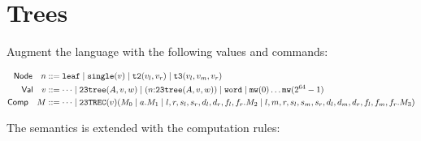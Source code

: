 \newcommand{\leaf}{\ensuremath{\mathtt{leaf}}}
\newcommand{\single}[1]{\ensuremath{\mathtt{single}(#1)}}
\newcommand{\ttwo}[2]{\ensuremath{\mathtt{t2}(#1,#2)}}
\newcommand{\tthree}[3]{\ensuremath{\mathtt{t3}(#1,#2,#3)}}
\newcommand{\ttrec}[8]{\mathtt{23TREC}(#1)(#2 \mid #3.#4 \mid #5.#6 \mid #7.#8)}
\newcommand{\tttree}[3]{\ensuremath{\mathtt{23tree}(#1,#2,#3)}}
\newcommand{\word}{\mathtt{word}}
\newcommand{\mw}[1]{\mathtt{mw}(#1)}
\newcommand{\join}{\mathsf{join}}
\newcommand{\cmp}{\mathsf{cmp}}
\newcommand{\ifnat}[3]{\mathsf{if}(#1;#2;#3)}
\newcommand{\const}[1]{\lam{\_}{\_}{#1}}
\newcommand{\eq}{\mathsf{eq}}
\newcommand{\macro}{@\!\!=}
\section{Trees}

Augment the language with the following values and commands:

\begin{align*}
    \mathsf{Node} \quad n &::= 
         \leaf
    \mid \single{v}
    \mid \ttwo{v_l}{v_r}
    \mid \tthree{v_l}{v_m}{v_r}\\
    \mathsf{Val} \quad v &::= \dots
    \mid \tttree{A}{v}{w}
    \mid (\isOf{n}{\tttree{A}{v}{w}})
    \mid \word
    \mid \mw{0} \dots \mw{2^{64}-1}\\
    \mathsf{Comp} \quad M &::= 
    \dots
    \mid \ttrec{v}{M_0}{a}{M_1}{l,r,s_l,s_r,d_l,d_r,f_l,f_r}{M_2}{l,m,r,s_l,s_m,s_r,d_l,d_m,d_r,f_l,f_m,f_r}{M_3}\\
\end{align*}

The semantics is extended with the computation rules:


